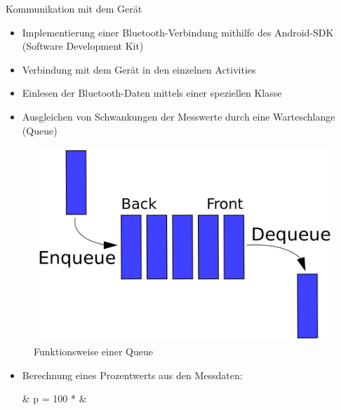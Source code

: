 \documentclass[final,20pt]{beamer}
\newlength{\colwidth}
\begin{document}
\begin{frame}[t]
\begin{columns}[t]
\begin{column}{\colwidth}
	\begin{alertblock}{Kommunikation mit dem Gerät}
		\begin{itemize}
			\item Implementierung einer Bluetooth-Verbindung mithilfe des Android-SDK (Software Development Kit)
			\item Verbindung mit dem Gerät in den einzelnen Activities
			\item Einlesen der Bluetooth-Daten mittels einer speziellen Klasse
			\item Ausgleichen von Schwankungen der Messwerte durch eine Warteschlange (Queue)
		\end{itemize}
		\begin{figure}[H]
			\centering
			\includegraphics[width=0.5\colwidth]{pics/queue}
			\caption{Funktionsweise einer Queue}
			\label{fig:queue}
		\end{figure}
		\begin{itemize}
			\item Berechnung eines Prozentwerts aus den Messdaten:
			\begin{flalign*}
			& p = 100 * &
			\end{flalign*}
		\end{itemize}
	\end{alertblock}


\end{column}
\end{columns}
\end{frame}
\end{document}
